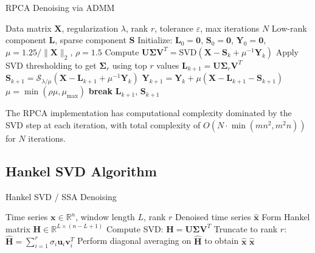 \documentclass[11pt]{article}
\begin{document}
\begin{algorithm}
\caption{RPCA Denoising via ADMM}
\begin{algorithmic}[1]
\REQUIRE Data matrix $\mathbf{X}$, regularization $\lambda$, rank $r$, tolerance $\varepsilon$, max iterations $N$
\ENSURE Low-rank component $\mathbf{L}$, sparse component $\mathbf{S}$
\STATE Initialize: $\mathbf{L}_0 = \mathbf{0}$, $\mathbf{S}_0 = \mathbf{0}$, $\mathbf{Y}_0 = \mathbf{0}$, $\mu = 1.25/\|\mathbf{X}\|_2$, $\rho = 1.5$
\STATE Compute $\mathbf{U}\mathbf{\Sigma}\mathbf{V}^T = \text{SVD}(\mathbf{X} - \mathbf{S}_k + \mu^{-1}\mathbf{Y}_k)$
\STATE Apply SVD thresholding to get $\mathbf{\Sigma}_r$ using top $r$ values
\STATE $\mathbf{L}_{k+1} = \mathbf{U}\mathbf{\Sigma}_r\mathbf{V}^T$
\STATE $\mathbf{S}_{k+1} = \mathcal{S}_{\lambda/\mu}(\mathbf{X} - \mathbf{L}_{k+1} + \mu^{-1}\mathbf{Y}_k)$
\STATE $\mathbf{Y}_{k+1} = \mathbf{Y}_k + \mu(\mathbf{X} - \mathbf{L}_{k+1} - \mathbf{S}_{k+1})$
\STATE $\mu = \min(\rho\mu, \mu_{\max})$
\STATE \textbf{break}
\ENDIF
\ENDFOR
\RETURN $\mathbf{L}_{k+1}$, $\mathbf{S}_{k+1}$
\end{algorithmic}
\end{algorithm}

The RPCA implementation has computational complexity dominated by the SVD step at each iteration, with total complexity of $O(N \cdot \min(mn^2, m^2n))$ for $N$ iterations.

\subsection{Hankel SVD Algorithm}

\begin{algorithm}
\caption{Hankel SVD / SSA Denoising}
\begin{algorithmic}[1]
\REQUIRE Time series $\mathbf{x} \in \mathbb{R}^n$, window length $L$, rank $r$
\ENSURE Denoised time series $\mathbf{\hat{x}}$
\STATE Form Hankel matrix $\mathbf{H} \in \mathbb{R}^{L \times (n-L+1)}$
\STATE Compute SVD: $\mathbf{H} = \mathbf{U} \mathbf{\Sigma} \mathbf{V}^T$
\STATE Truncate to rank $r$: $\mathbf{\hat{H}} = \sum_{i=1}^{r} \sigma_i \mathbf{u}_i \mathbf{v}_i^T$
\STATE Perform diagonal averaging on $\mathbf{\hat{H}}$ to obtain $\mathbf{\hat{x}}$
\RETURN $\mathbf{\hat{x}}$
\end{algorithmic}
\end{algorithm}
\end{document}
